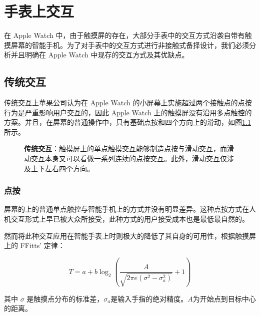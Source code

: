 \chapter{手表上交互}

\quad\quad 在 Apple Watch 中，由于触摸屏的存在，大部分手表中的交互方式沿袭自带有触摸屏幕的智能手机\cite{WatchGuidelines:2016}。为了对手表中的交互方式进行非接触式备择设计，我们必须分析并且明确在 Apple Watch 中现存的交互方式及其优缺点。

\section{传统交互}

传统交互上苹果公司认为在 Apple Watch 的小屏幕上实施超过两个接触点的点按行为是严重影响用户交互的，因此 Apple Watch 上的触摸屏没有沿用多点触控的方案。并且，在屏幕的普通操作中，只有基础点按和四个方向上的滑动，如图\ref{fig:gesture}所示。

\begin{figure}[H]
\centering
{}
\caption{\textbf{传统交互}：触摸屏上的单点触摸交互能够制造点按与滑动交互，而滑动交互本身又可以看做一系列连续的点按交互。此外，滑动交互仅涉及上下左右四个方向。}
\label{fig:gesture}
\end{figure}

\subsection{点按}

屏幕的上的普通单点触控与智能手机上的方式并没有明显差异。这种点按方式在人机交互形式上早已被大众所接受，此种方式的用户接受成本也是最低最自然的。

然而将此种交互应用在智能手表上时则极大的降低了其自身的可用性，根据触摸屏上的 FFitts' 定律\cite{Bi:2013:FLM:2470654.2466180}：

\begin{equation}
T=a+b\log_{2}{\left(\frac{A}{\sqrt{2\pi e(\sigma^2-\sigma_{a}^2)}}+1 \right)}
\end{equation}

其中 $\sigma$ 是触摸点分布的标准差，$\sigma_a$是输入手指的绝对精度。$A$为开始点到目标中心的距离。

